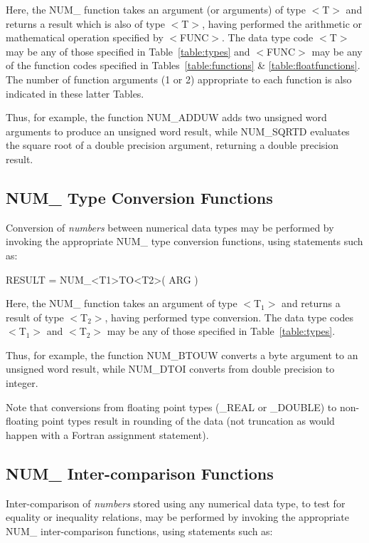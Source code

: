 \documentclass[11pt,nolof]{starlink}
\providecommand{\name}[1]{\mbox{#1}}
\begin{document}
Here, the \name{NUM\_} function takes an argument (or arguments) of type
\name{$<$T$>$} and returns a result which is also of type \name{$<$T$>$},
having performed the arithmetic or mathematical operation specified by
\name{$<$FUNC$>$}.
The data type code \name{$<$T$>$} may be any of those specified in
Table~\ref{table:types} and \name{$<$FUNC$>$} may be any of the function
codes specified in Tables~\ref{table:functions} \&
\ref{table:floatfunctions}.
The number of function arguments (1 or 2) appropriate to each function is
also indicated in these latter Tables.

Thus, for example, the function \name{NUM\_ADDUW} adds two unsigned word
arguments to produce an unsigned word result, while \name{NUM\_SQRTD}
evaluates the square root of a double precision argument, returning a double
precision result.

\subsection{NUM\_ Type Conversion Functions}

Conversion of \emph{numbers} between numerical data types may be performed by
invoking the appropriate \name{NUM\_} type conversion functions, using
statements such as:

\begin{terminalv}
RESULT = NUM_<T1>TO<T2>( ARG )
\end{terminalv}

Here, the \name{NUM\_} function takes an argument of type \name{$<$T$_{1}>$}
and returns a result of type \name{$<$T$_{2}>$}, having performed type
conversion.
The data type codes \name{$<$T$_{1}>$} and \name{$<$T$_{2}>$} may be any of
those specified in Table~\ref{table:types}.

Thus, for example, the function \name{NUM\_BTOUW} converts a byte argument
to an unsigned word result, while \name{NUM\_DTOI} converts from double
precision to integer.

Note that conversions from floating point types (\name{\_REAL} or
\name{\_DOUBLE}) to non-floating point types result in rounding of the data
(not truncation as would happen with a Fortran assignment statement).

\subsection{NUM\_ Inter-comparison Functions}
\label{section:logicals}

Inter-comparison of \emph{numbers} stored using any numerical data type, to
test for equality or inequality relations, may be performed by invoking the
appropriate \name{NUM\_} inter-comparison functions, using statements such as:
\end{document}
